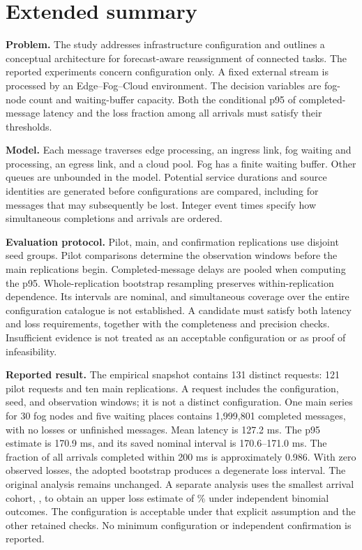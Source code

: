 \documentclass{psta}
\begin{document}
\section*{Extended summary}
\textbf{Problem.} The study addresses infrastructure configuration and outlines a conceptual architecture for forecast-aware reassignment of connected tasks. The reported experiments concern configuration only. A fixed external stream is processed by an Edge--Fog--Cloud environment. The decision variables are fog-node count and waiting-buffer capacity. Both the conditional p95 of completed-message latency and the loss fraction among all arrivals must satisfy their thresholds.

\textbf{Model.} Each message traverses edge processing, an ingress link, fog waiting and processing, an egress link, and a cloud pool. Fog has a finite waiting buffer. Other queues are unbounded in the model. Potential service durations and source identities are generated before configurations are compared, including for messages that may subsequently be lost. Integer event times specify how simultaneous completions and arrivals are ordered.

\textbf{Evaluation protocol.} Pilot, main, and confirmation replications use disjoint seed groups. Pilot comparisons determine the observation windows before the main replications begin. Completed-message delays are pooled when computing the p95. Whole-replication bootstrap resampling preserves within-replication dependence. Its intervals are nominal, and simultaneous coverage over the entire configuration catalogue is not established. A candidate must satisfy both latency and loss requirements, together with the completeness and precision checks. Insufficient evidence is not treated as an acceptable configuration or as proof of infeasibility.

\textbf{Reported result.} The empirical snapshot contains 131 distinct requests: 121 pilot requests and ten main replications. A request includes the configuration, seed, and observation windows; it is not a distinct configuration. One main series for 30 fog nodes and five waiting places contains 1,999,801 completed messages, with no losses or unfinished messages. Mean latency is 127.2 ms. The p95 estimate is 170.9 ms, and its saved nominal interval is 170.6--171.0 ms. The fraction of all arrivals completed within 200 ms is approximately 0.986. With zero observed losses, the adopted bootstrap produces a degenerate loss interval. The original analysis remains unchanged. A separate analysis uses the smallest arrival cohort, \cNmin{}, to obtain an upper loss estimate of \cLossPercentEN{}\% under independent binomial outcomes. The configuration is acceptable under that explicit assumption and the other retained checks. No minimum configuration or independent confirmation is reported.
\end{document}
